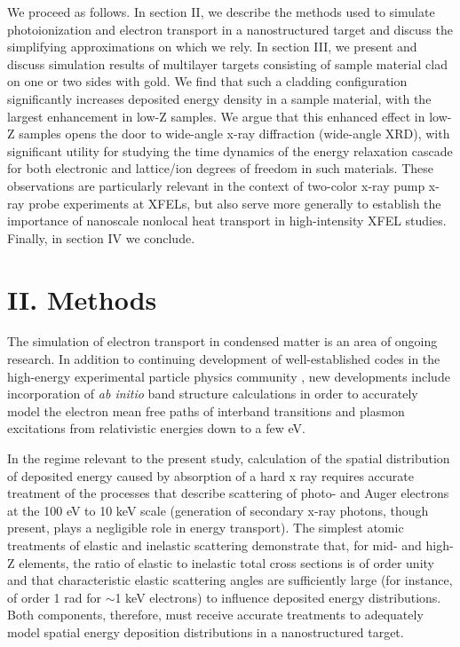 We proceed as follows. In section II, we describe the methods used to
simulate photoionization and electron transport in a nanostructured
target and discuss the simplifying approximations on which we rely. In
section III, we present and discuss simulation results of multilayer
targets consisting of sample material clad on one or two sides with
gold. We find that such a cladding configuration significantly increases
deposited energy density in a sample material, with the largest
enhancement in low-Z samples. We argue that this enhanced effect in
low-Z samples opens the door to wide-angle x-ray diffraction (wide-angle
XRD), with significant utility for studying the time dynamics of the
energy relaxation cascade for both electronic and lattice/ion degrees of
freedom in such materials. These observations are particularly relevant
in the context of two-color x-ray pump x-ray probe experiments at
XFELs\cite{HOIDN2017NONLOCAL, INOUE2016OBSERVATION, HO2015RESONANCE, ALLARIA2013TWO}, but also serve more generally to establish the
importance of nanoscale nonlocal heat transport in high-intensity XFEL
studies. Finally, in section IV we conclude.

\section{II. Methods}

The simulation of electron transport in condensed matter is an area of
ongoing research. In addition to continuing development of
well-established codes in the high-energy experimental particle physics
community \cite{AGOSTINELLI2003GEANT4}, new developments include incorporation of
\emph{ab initio} band structure calculations in order to accurately
model the electron mean free paths of interband transitions and plasmon
excitations from relativistic energies down to a few eV. \cite{GAO2013MONTE, PRANGE2014RADIATION}

In the regime relevant to the present study, calculation of the spatial
distribution of deposited energy caused by absorption of a hard x ray
requires accurate treatment of the processes that describe scattering of
photo- and Auger electrons at the 100 eV to 10 keV scale (generation of
secondary x-ray photons, though present, plays a negligible role in
energy transport). The simplest atomic treatments of elastic and
inelastic scattering demonstrate that, for mid- and high-Z elements, the
ratio of elastic to inelastic total cross sections is of order unity and
that characteristic elastic scattering angles are sufficiently large
(for instance, of order 1 rad for $\sim$1 keV electrons) to
influence deposited energy distributions. \cite{POLLOCK2017ACCURACY} Both components,
therefore, must receive accurate treatments to adequately model spatial
energy deposition distributions in a nanostructured target.

